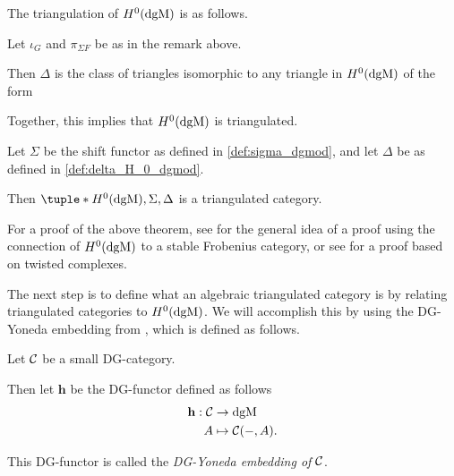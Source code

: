 The triangulation of \( H^0(\operatorname{dgM}) \) is as follows.
\begin{definition}
    \label{def:delta_H_0_dgmod}
    Let \( \iota_G \) and \( \pi_{\Sigma F} \) be as in the remark above.

    Then \( \Delta \) is the class of triangles isomorphic to any triangle in \( H^0(\operatorname{dgM}) \) of the form
    \begin{center}
    \end{center}
\end{definition}

Together, this implies that \( H^0(\operatorname{dgM}) \) is triangulated.
\begin{theorem}
    Let \( \Sigma \) be the shift functor as defined in \autoref{def:sigma_dgmod}, and let \( \Delta \) be as defined in \autoref{def:delta_H_0_dgmod}.

    Then \( \tuple*{H^0(\dgM), \Sigma, \Delta} \) is a triangulated category.
\end{theorem}
For a proof of the above theorem, see \cite[p.\ 31]{Jasso-Muro_2023} for the general idea of a proof using the connection of \( H^0(\operatorname{dgM}) \) to a stable Frobenius category, or see \cite[p.\ 97]{Bondal--Kapranov_1991} for a proof based on twisted complexes.

The next step is to define what an algebraic triangulated category is by relating triangulated categories to \( H^0(\operatorname{dgM}) \). We will accomplish this by using the DG-Yoneda embedding from \cite[Corollary 6.3.6]{Borceux_1994}, which is defined as follows.
\begin{definition}
    \label{def:DG_Yoneda_embedding}
    Let \( {\mathcal{C}} \) be a small DG-category.
    
    Then let \( \mathbf{h} \) be the DG-functor defined as follows
    \begin{align*}
        \mathbf{h}: {\mathcal{C}} &\to \operatorname{dgM} \\
        A &\mapsto {\mathcal{C}}(-, A).
    \end{align*}

    This DG-functor is called the \emph{DG-Yoneda embedding of \( {\mathcal{C}} \)}.
\end{definition}


